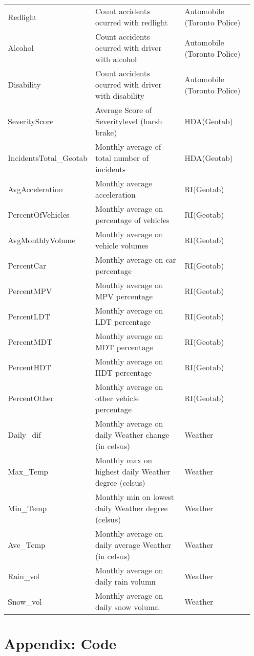 \documentclass[]{article}
\begin{document}
\begin{tabular}{lll}
Redlight & Count accidents ocurred with redlight & Automobile (Toronto Police)\\
Alcohol & Count accidents ocurred with driver with alcohol & Automobile (Toronto Police)\\
Disability & Count accidents ocurred with driver with disability & Automobile (Toronto Police)\\
SeverityScore & Average Score of Severitylevel (harsh brake) & HDA(Geotab)\\
IncidentsTotal\_Geotab & Monthly average of total number of incidents & HDA(Geotab)\\
AvgAcceleration & Monthly average acceleration & RI(Geotab)\\
PercentOfVehicles & Monthly average on percentage of vehicles & RI(Geotab)\\
AvgMonthlyVolume & Monthly average on vehicle volumes & RI(Geotab)\\
PercentCar & Monthly average on car percentage & RI(Geotab)\\
PercentMPV & Monthly average on MPV percentage & RI(Geotab)\\
PercentLDT & Monthly average on LDT percentage & RI(Geotab)\\
PercentMDT & Monthly average on MDT percentage & RI(Geotab)\\
PercentHDT & Monthly average on HDT percentage & RI(Geotab)\\
PercentOther & Monthly average on other vehicle percentage & RI(Geotab)\\
Daily\_dif & Monthly average on daily Weather change (in celsus) & Weather\\
Max\_Temp & Monthly max on highest daily Weather degree (celsus) & Weather\\
Min\_Temp & Monthly min on lowest daily Weather degree (celsus) & Weather\\
Ave\_Temp & Monthly average on daily average Weather (in celsus) & Weather\\
Rain\_vol & Monthly average on daily rain volumn & Weather\\
Snow\_vol & Monthly average on daily snow volumn & Weather\\
\bottomrule
\end{tabular}

\pagebreak

\newpage

\section{Appendix: Code}\label{appendix-code}
\end{document}
